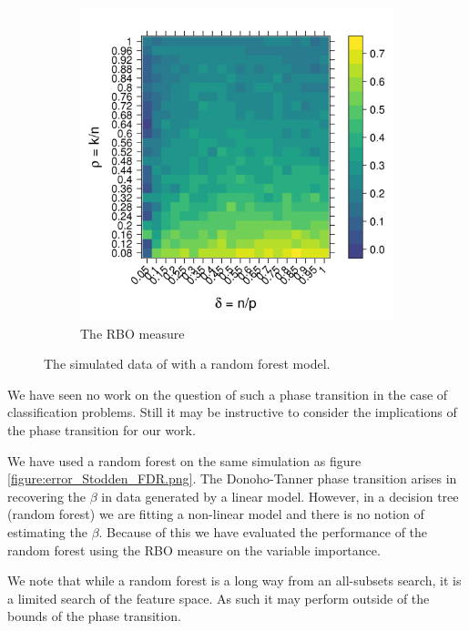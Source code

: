\documentclass[10pt,letterpaper]{article}
\begin{document}
\begin{figure}[tbhp]
\begin{subfigure}[t]{0.5\linewidth}
       \includegraphics[totalheight=6cm]{./figs/ranger_rbo_Stodden_simulation.png}
       \caption{The RBO measure}
       \label{figure:ranger_rbo_Stodden_simulation.png}
     \end{subfigure} 
     \caption{The simulated data of  with a random forest model.}
     \label{figure:ranger_rbo_Stodden_simulation.png}
 \end{figure}


We have seen no work on the question of such a phase transition in the case of classification problems. Still it may be
instructive to consider the implications of the phase transition for our work. 

We have used a random forest on the same simulation as figure \ref{figure:error_Stodden_FDR.png}.  The Donoho-Tanner phase transition arises in
recovering the $\beta$ in data generated by a linear model. However, in a decision tree (random forest) we are fitting a
non-linear model and there is no notion of estimating the $\beta$. Because of this we have evaluated the performance of
the random forest using the RBO measure on the variable importance.

We note that while a random forest is a long way from an all-subsets search, it is a limited search of
the feature space. As such it may perform outside of the bounds of the phase transition. 
\end{document}

